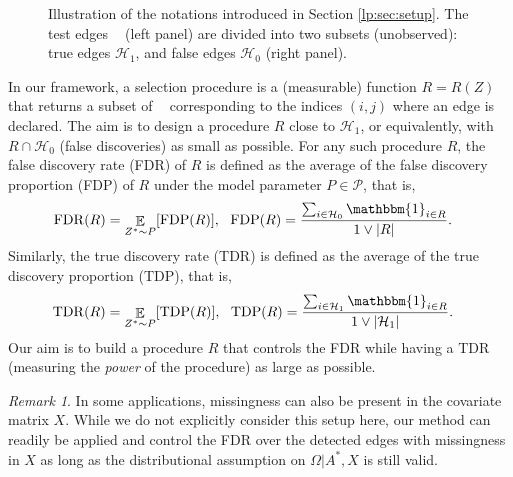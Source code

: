 \documentclass[a4paper, 11pt]{article}
\theoremstyle{remark}
\newtheorem{remark}{Remark}
\DeclareMathOperator{\ind}{\mathbbm{1}}
\DeclareMathOperator{\E}{\mathbb{E}}
\DeclareMathOperator{\FDR}{FDR}
\DeclareMathOperator{\FDP}{FDP}
\DeclareMathOperator{\TDR}{TDR}
\DeclareMathOperator{\TDP}{TDP}
\DeclareMathOperator{\Dtest}{\cD_{\text{test}}}
\newcommand{\EM}{\ensuremath}
\newcommand{\cD}{\EM{\mathcal{D}}}
\newcommand{\cH}{\EM{\mathcal{H}}}
\begin{document}
\begin{figure}
\begin{minipage}{0.5\linewidth}
\end{minipage}

\caption{Illustration of the notations introduced in Section \ref{lp:sec:setup}. The test edges $\Dtest$ (left panel) are divided into two subsets (unobserved): true edges $\cH_1$, and false edges $\cH_0$ (right panel).  } 
\label{lp:fig:notations}
\end{figure}


In our framework, a selection procedure is a (measurable) function $R=R(Z)$ that returns a subset of $\Dtest$ corresponding to the indices $(i,j)$ where an edge is declared. 
The aim is to design a procedure $R$ close to $\cH_1$, or equivalently, with $R\cap \cH_0$ (false discoveries) as small as possible. 
For any such procedure $R$, the false discovery rate (FDR) of $R$ is defined as the average of the false discovery proportion (FDP) of $R$ under the model parameter $P\in \mathcal{P}$, 
that is, 
\begin{align*}
\FDR(R)&=\E_{Z^* \sim P} [\FDP(R)],\:\:\: \FDP(R)=\frac{\sum_{i\in \cH_0} \ind_{i\in R}}{1\vee |R|}.%
\end{align*}
{Similarly, the true discovery rate (TDR) is defined as the average of the true discovery proportion (TDP), that is,}
\begin{align*}
\TDR(R)&= \E_{Z^* \sim P} [\TDP(R)],\:\:\: 
\TDP(R)=\frac{\sum_{i\in \cH_1} \ind_{i\in R}}{1\vee \vert \cH_1 \vert }.%
\end{align*}
Our aim is to build a procedure $R$ that controls the FDR while having a TDR (measuring the \textit{power} of the procedure) as large as possible.


\begin{remark}
In some applications, missingness can also be present in the covariate matrix $X$. 
While we do not explicitly consider this setup here,
our method can readily be applied and control the FDR over the detected edges with missingness in $X$ as long as the distributional assumption on $\Omega \vert A^*, X$ is still valid.%
\end{remark}
\end{document}
